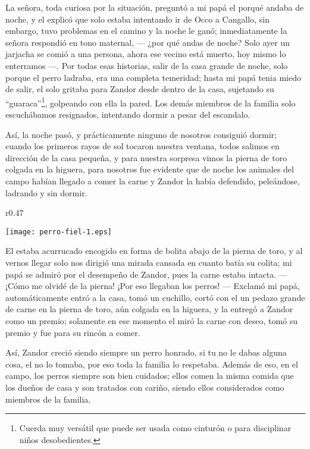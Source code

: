 La señora, toda curiosa por la situación, preguntó a mi papá el porqué andaba de noche, y el explicó que solo estaba intentando ir de Occo a Cangallo, sin embargo, tuvo problemas en el camino y la noche le ganó; inmediatamente la señora respondió en tono maternal, --- ¿por qué andas de noche? Solo ayer un jarjacha se comió a una persona, ahora ese vecino está muerto, hoy mismo lo enterramos ---.
Por todas esas historias, salir de la casa grande de noche, solo porque el perro ladraba, era una completa temeridad; hasta mi papá tenia miedo de salir, el solo gritaba para Zandor desde dentro de la casa, sujetando su ``guaraca''\footnote{Cuerda muy versátil que puede ser usada como cinturón o para disciplinar niños desobedientes.}, golpeando con ella la pared.
Los demás miembros de la familia solo escuchábamos resignados, intentando dormir a pesar del escandalo.

Así, la noche pasó, y prácticamente ninguno de nosotros consiguió dormir; cuando los primeros rayos de sol tocaron nuestra ventana, todos salimos en dirección de la casa pequeña, y para nuestra sorpresa vimos la pierna de toro colgada en la higuera, para nosotros fue evidente que de noche los animales del campo habían llegado a comer la carne y Zandor la había defendido, peleándose, ladrando y sin dormir. 
\begin{wrapfigure}{r}{0.47\textwidth}
  \begin{center}
  \vspace{-0.5cm}
    \texttt{[image: perro-fiel-1.eps]}
  \end{center}
  \vspace{-0.5cm}
\end{wrapfigure}
El estaba acurrucado encogido en forma de bolita abajo de la pierna de toro, y al vernos llegar solo nos dirigió una mirada cansada en cuanto batía su colita; mi papá se admiró por el desempeño de Zandor, pues la carne estaba intacta. --- ¡Cómo me olvidé de la pierna! ¡Por eso llegaban los perros! ---
Exclamó mi papá, automáticamente entró a la casa, tomó un cuchillo, cortó con el un pedazo grande de carne en la pierna de toro, aún colgada en la higuera, y la entregó a Zandor como un premio; solamente en ese momento el miró la carne con deseo, tomó su premio y fue para su rincón a comer.

Así, Zandor creció siendo siempre un perro honrado, si tu no le dabas alguna cosa, el no lo tomaba, por eso toda la familia lo respetaba. Además de eso, en el campo, los perros siempre son bien cuidados; ellos comen la misma comida que los dueños de casa y son tratados con cariño, siendo ellos considerados como miembros de la familia.


